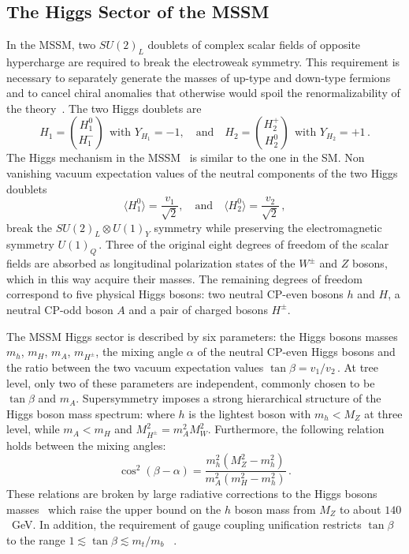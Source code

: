 

\subsection{The Higgs Sector of the MSSM }\label{sec:hsector}
In the MSSM, two $SU(2)_L$ doublets of complex scalar fields of opposite hypercharge are required to break the electroweak symmetry.
This requirement is necessary to separately generate the masses of up-type and down-type fermions~\cite{Susy2,Higgsm1,Higgsm2}
and to cancel chiral anomalies that otherwise would spoil the renormalizability of the theory~\cite{Higgsm3}. The two Higgs doublets  are
\begin{equation}
H_1 = \binom{H_1^0}{H_1^-} ~ ~ \text{with } Y_{H_1} = -1, \quad \text{and} \quad H_2 = \binom{H_2^+}{H_2^0} ~ ~ \text{with } Y_{H_2} = +1 \,. 
\end{equation}
The Higgs mechanism in the MSSM~\cite{MSSM1,Higgsm4} is similar to the one in the SM.
Non vanishing vacuum expectation values of the neutral components of the two Higgs doublets
\begin{equation}
\langle H_1^0 \rangle = \frac{v_1}{\sqrt{2}}, \quad \text{and} \quad  \langle H_2^0 \rangle = \frac{v_2}{\sqrt{2}}\,,
\end{equation}
break the $SU(2)_L \otimes U(1)_Y$ symmetry while preserving the electromagnetic symmetry $U(1)_Q\,$.
Three of the original eight degrees of freedom of the scalar fields are absorbed as longitudinal polarization states of 
the $W^{\pm}$ and $Z$ bosons, which in this way acquire their masses. 
The remaining degrees of freedom correspond to five physical Higgs bosons: two neutral CP-even 
bosons $h$ and $H$, 
a neutral CP-odd boson $A$ and a pair of charged bosons $H^{\pm}$. 

The MSSM Higgs sector is described by six parameters: the Higgs bosons masses $m_h$, $m_H$, $m_A$, $m_{H^\pm}$,
the mixing angle $\alpha$ of the neutral CP-even Higgs bosons  and the ratio between the two vacuum expectation values $\tan \beta = v_1/v_2\,$.
At tree level,  only two of these parameters  are  independent, commonly chosen to be  $\tan \beta$ and $m_A$. 
Supersymmetry imposes a strong hierarchical structure of the Higgs boson mass spectrum:  
where $h$ is the lightest boson with $m_h < M_Z$ at three level, while  $m_A < m_H$  and $M_{H^\pm}^2 = m_A^2 M_W^2$. Furthermore, the 
following relation holds between the mixing angles:
\begin{equation}\label{eq:mixing}
\cos^2(\beta - \alpha) = \frac{m_h^2 (M_Z^2 - m_h^2)}{m_A^2 (m_H^2 - m_h^2)} \,.
\end{equation}
These relations are broken by large radiative corrections to the Higgs bosons 
masses~\cite{Higgsm5} which raise the upper bound on the  $h$ boson mass from  $M_Z$ to about $140$~GeV.
In addition, the requirement of gauge coupling unification restricts $\tan\beta$ to the range  $1 \apprle \tan \beta \apprle m_t/m_b$ ~\cite{Higgsm6}.


